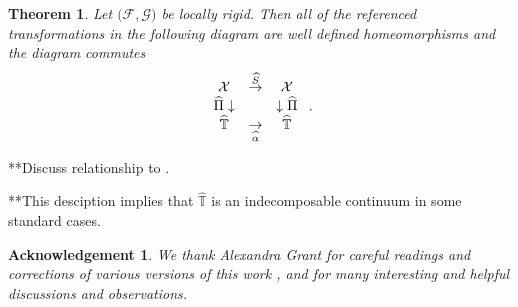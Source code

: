 \documentclass{amsproc}
\newtheorem{theorem}{Theorem}
\theoremstyle{plain}
\newtheorem{acknowledgement}{Acknowledgement}
\theoremstyle{definition}
\numberwithin{equation}{section}
\begin{document}
\begin{theorem}
Let $(\mathcal{F},\mathcal{G)}$ be locally rigid. Then all of the referenced
transformations in the following diagram are well defined homeomorphisms and
the diagram commutes 
\begin{equation*}
\begin{array}{ccc}
\mathcal{X} & \overset{\widehat{S}}{\rightarrow} & \mathcal{X} \\ 
\widehat{\Pi}\downarrow &  & \downarrow\widehat{\Pi} \\ 
\widehat{\mathbb{T}} & \underset{\widehat{\alpha}}{\rightarrow} & \widehat{%
\mathbb{T}}%
\end{array}
\text{ .}
\end{equation*}
\end{theorem}

**Discuss relationship to \cite{anderson}.

**This desciption implies that $\widehat{\mathbb{T}}$ is an indecomposable
continuum in some standard cases.

\begin{acknowledgement}
We thank Alexandra Grant for careful readings and corrections of various
versions of this work , and for many interesting and helpful discussions and
observations.
\end{acknowledgement}
\end{document}
